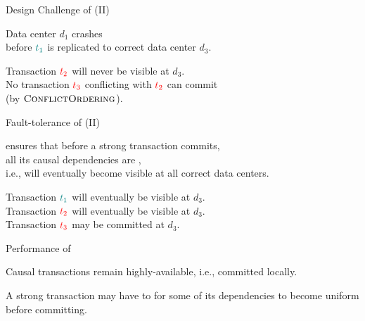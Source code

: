 \begin{frame}{Design Challenge of \unistore{} (II)}
  \begin{center}
    Data center $d_{1}$ crashes \\[3pt]
    before $\textcolor{teal}{t_{1}}$ is replicated to correct data center $d_{3}$.

    \vspace{0.50cm}

    \pause
    \vspace{0.30cm}
    Transaction $\textcolor{red}{t_{2}}$ will never be visible at $d_{3}$. \\[3pt]
    No transaction $\textcolor{red}{t_{3}}$ conflicting with $\textcolor{red}{t_{2}}$ can commit \\
    (by $\textsc{ConflictOrdering}$).
  \end{center}
\end{frame}

\begin{frame}{Fault-tolerance of \unistore{} (II)}
  \begin{center}
    \unistore{} ensures that before a strong transaction commits, \\[3pt]
    all its causal dependencies are , \\[3pt]
    i.e., will eventually become visible at all correct data centers.

    \vspace{0.30cm}

    \pause
    Transaction $\textcolor{teal}{t_{1}}$ will eventually be visible at $d_{3}$. \\[3pt]
    Transaction $\textcolor{red}{t_{2}}$ will eventually be visible at $d_{3}$. \\[3pt]
    Transaction $\textcolor{red}{t_{3}}$ may be committed at $d_{3}$. \\[3pt]
  \end{center}
\end{frame}

\begin{frame}{Performance of \unistore}
  \begin{center}
    Causal transactions remain highly-available, i.e., committed locally. \\[6pt]

    \vspace{0.30cm}

    \vspace{0.20cm}
    A strong transaction may have to  for some of its dependencies
    to become uniform before committing.

    \pause
    \vspace{0.50cm}
  \end{center}
\end{frame}

